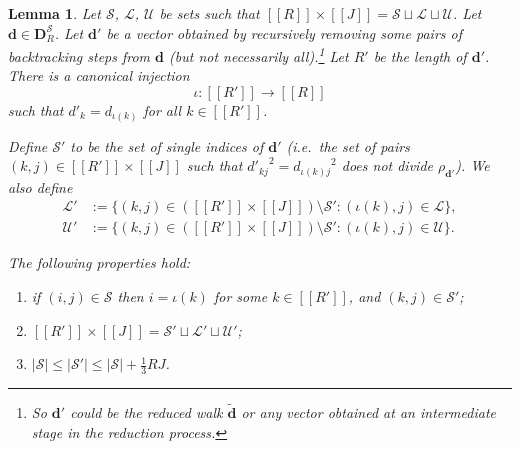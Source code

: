 \documentclass[11pt]{amsart}
\newtheorem{lemma}[theorem]{Lemma}
\theoremstyle{definition}
\renewcommand{\leq}{\leqslant}
\newcommand{\sinterval}[1]{[\![#1]\!] }
\renewcommand{\d}{\boldsymbol{d}}
\newcommand{\pcomp}[2]{d_{#1#2}}
\newcommand{\fprod}[1]{\rho_{#1}}
\newcommand{\pallprime}{\fprod{\d'}}
\newcommand{\lit}{\mathcal{L}}
\newcommand{\unlit}{\mathcal{U}}
\newcommand{\s}{\mathcal{S}}
\newcommand{\fancyD}{\mathbf{D}}
\newcommand{\DsR}{\fancyD^{\s}_{\!\tupsize}}
\newcommand{\repR}{J}
\newcommand{\newR}{\sinterval{J}}
\newcommand{\Redd}{\widetilde{\d}}
\newcommand{\newerKRR}{\sinterval{\tupsize}\times\newR}
\newcommand{\tupsize}{R}
\newcommand{\myfunction}{\iota}
\begin{document}
\begin{lemma}
\label{lem:reducedlit}
Let $\s$, $\lit$, $\unlit$ be sets such that $\newerKRR = \s\sqcup\lit\sqcup\unlit$. Let $\d \in \DsR$. Let $\d'$ be a vector obtained by recursively removing some pairs of backtracking steps from $\d$ (but not necessarily all).\footnote{So $\d'$ could be the reduced walk $\Redd$ or any vector obtained at an intermediate stage in the reduction process.} Let $\tupsize'$ be the length of $\d'$. There is a canonical injection
\begin{equation*}
	\myfunction : \sinterval{\tupsize'} \to \sinterval{\tupsize}
\end{equation*}
such that $d'_k = d_{\myfunction(k)}$ for all $k\in \sinterval{\tupsize'}$. 

Define $\s'$ to be the set of single indices of $\d'$ (i.e.~the set of pairs $(k,j)\in \sinterval{\tupsize'}\times \newR$ such that ${d'_{kj}}^2 = {\pcomp{\myfunction(k)}{j}}^2$ does not divide $\pallprime$). We also define
\begin{align*}
	\lit' &:= \{(k,j)\in (\sinterval{\tupsize'} \times \newR) \setminus \s' : (\myfunction(k), j)\in \lit\}, \\
	\unlit' &:= \{(k,j)\in (\sinterval{\tupsize'} \times \newR) \setminus \s' : (\myfunction(k), j)\in \unlit\}.
\end{align*}

The following properties hold:
\begin{enumerate}
	\item if $(i,j)\in \s$ then $i = \myfunction(k)$ for some $k\in \sinterval{\tupsize'}$, and $(k,j)\in \s'$;
	\item $\sinterval{\tupsize'} \times \newR = \s' \sqcup \lit' \sqcup \unlit'$;
	\item $|\s| \leq |\s'| \leq |\s| + \tfrac13 \tupsize \repR$.
\end{enumerate}
\end{lemma}
\end{document}
